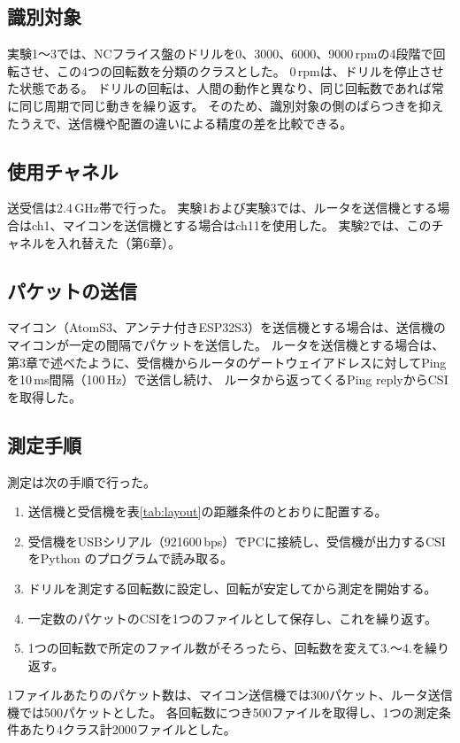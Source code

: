 \documentclass[uplatex, 12pt]{ujbook}
\begin{document}
\subsection{識別対象}
実験1〜3では、NCフライス盤のドリルを0、3000、6000、9000\,rpmの4段階で回転させ、この4つの回転数を分類のクラスとした。
0\,rpmは、ドリルを停止させた状態である。
ドリルの回転は、人間の動作と異なり、同じ回転数であれば常に同じ周期で同じ動きを繰り返す。
そのため、識別対象の側のばらつきを抑えたうえで、送信機や配置の違いによる精度の差を比較できる。

\subsection{使用チャネル}
送受信は2.4\,GHz帯で行った。
実験1および実験3では、ルータを送信機とする場合はch1、マイコンを送信機とする場合はch11を使用した。
実験2では、このチャネルを入れ替えた（第6章）。

\subsection{パケットの送信}
マイコン（AtomS3、アンテナ付きESP32S3）を送信機とする場合は、送信機のマイコンが一定の間隔でパケットを送信した。
ルータを送信機とする場合は、第3章で述べたように、受信機からルータのゲートウェイアドレスに対してPingを10\,ms間隔（100\,Hz）で送信し続け、
ルータから返ってくるPing replyからCSIを取得した。

\subsection{測定手順}
測定は次の手順で行った。
\begin{enumerate}
  \item 送信機と受信機を表\ref{tab:layout}の距離条件のとおりに配置する。
  \item 受信機をUSBシリアル（921600\,bps）でPCに接続し、受信機が出力するCSIをPython のプログラムで読み取る。
  \item ドリルを測定する回転数に設定し、回転が安定してから測定を開始する。
  \item 一定数のパケットのCSIを1つのファイルとして保存し、これを繰り返す。
  \item 1つの回転数で所定のファイル数がそろったら、回転数を変えて3.〜4.を繰り返す。
\end{enumerate}
1ファイルあたりのパケット数は、マイコン送信機では300パケット、ルータ送信機では500パケットとした。
各回転数につき500ファイルを取得し、1つの測定条件あたり4クラス計2000ファイルとした。
\end{document}
